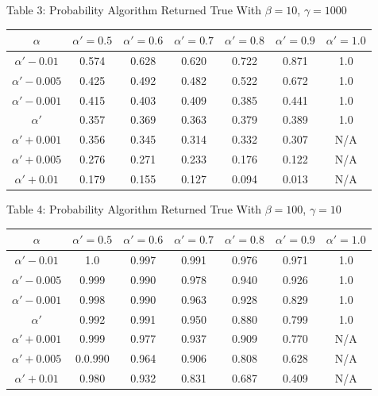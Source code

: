 \documentclass{article}
\begin{document}
\begin{center}
Table 3: Probability Algorithm Returned True With $\beta=10$, $\gamma=1000$ \\
\begin{tabular}{|c|c|c|c|c|c|c|}
\hline
$\alpha$ & $\alpha' = 0.5$ & $\alpha' = 0.6$ & $\alpha' = 0.7$ & $\alpha' = 0.8$ & $\alpha' = 0.9$ & $\alpha' = 1.0$ \\
\hline
$\alpha' -0.01$ & 0.574 & 0.628 & 0.620 & 0.722 & 0.871 & 1.0 \\
\hline
$\alpha'-0.005$ & 0.425 & 0.492 & 0.482 & 0.522 & 0.672 & 1.0 \\
\hline
$\alpha'-0.001$ & 0.415 & 0.403 & 0.409 & 0.385 & 0.441 & 1.0 \\
\hline
$\alpha'$            & 0.357 & 0.369 & 0.363 & 0.379 & 0.389 & 1.0 \\
\hline
$\alpha'+0.001$ & 0.356 & 0.345 & 0.314 & 0.332 & 0.307 & N/A \\
\hline
$\alpha'+0.005$ & 0.276 & 0.271 & 0.233 & 0.176 & 0.122 & N/A \\
\hline
$\alpha'+0.01 $ & 0.179 & 0.155 & 0.127 & 0.094 & 0.013 & N/A \\
\hline
\end{tabular}
\end{center}

\begin{center}
Table 4: Probability Algorithm Returned True With $\beta=100$, $\gamma=10$ \\
\begin{tabular}{|c|c|c|c|c|c|c|}
\hline
$\alpha$ & $\alpha' = 0.5$ & $\alpha' = 0.6$ & $\alpha' = 0.7$ & $\alpha' = 0.8$ & $\alpha' = 0.9$ & $\alpha' = 1.0$ \\
\hline
$\alpha' -0.01$ & 1.0 & 0.997 & 0.991 & 0.976 & 0.971 & 1.0 \\
\hline
$\alpha'-0.005$ & 0.999 & 0.990 & 0.978 & 0.940 & 0.926 & 1.0 \\
\hline
$\alpha'-0.001$ & 0.998 & 0.990 & 0.963 & 0.928 & 0.829 & 1.0 \\
\hline
$\alpha'$            & 0.992 & 0.991 & 0.950 & 0.880 & 0.799 & 1.0 \\
\hline
$\alpha'+0.001$ & 0.999 & 0.977 & 0.937 & 0.909 & 0.770 & N/A \\
\hline
$\alpha'+0.005$ & 0.0.990 & 0.964 & 0.906 & 0.808 & 0.628 & N/A \\
\hline
$\alpha'+0.01 $ & 0.980 & 0.932 & 0.831 & 0.687 & 0.409 & N/A \\
\hline
\end{tabular}
\end{center}
\end{document}
